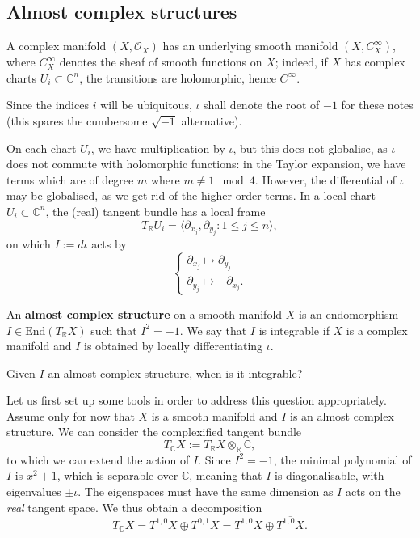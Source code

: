 \documentclass[11pt]{amsart}
\newcommand{\cO}{\mathcal{O}}
\newcommand{\tbf}[1]{\textbf{#1}}
\newcommand{\R}{\mathbb R}
\newcommand{\C}{\mathbb C}
\theoremstyle{definition}
\numberwithin{equation}{section}
\begin{document}
\subsection{Almost complex structures}
A complex manifold $(X,\cO_X)$ has an underlying smooth manifold $(X, C^\infty_X)$, where $C^\infty_X$ denotes the sheaf of smooth functions on $X$; indeed, if $X$ has complex charts $U_i\subset \C^n$, the transitions are holomorphic, hence $C^\infty$. 
\begin{notation}
	Since the indices $i$ will be ubiquitous, $\iota$ shall denote the root of $-1$ for these notes (this spares the cumbersome $\sqrt{-1}$ alternative).
\end{notation}
On each chart $U_i$, we have multiplication by $\iota$, but this does not globalise, as $\iota$ does not commute with holomorphic functions: in the Taylor expansion, we have terms which are of degree $m$ where $m\neq 1\mod 4$. However, the differential of $\iota$ may be globalised, as we get rid of the higher order terms. In a local chart $U_i\subset \C^n$, the (real) tangent bundle has a local frame
\[
T_\R U_i=\langle \partial_{x_j},\partial_{y_j}:1\leq j\leq n\rangle,
\]
on which $I:=d\iota$ acts by
\[
\begin{cases}
	\partial_{x_j}\mapsto \partial_{y_j}\\
	\partial_{y_j}\mapsto -\partial_{x_j}.
\end{cases}
\]
\begin{definition}
	An \tbf{almost complex structure} on a smooth manifold $X$ is an endomorphism $I\in \text{End}(T_\R X)$ such that $I^2=-1$. We say that $I$ is integrable if $X$ is a complex manifold and $I$ is obtained by locally differentiating $\iota$. 
\end{definition}
\begin{question}\label{q: integrable?}
	Given $I$ an almost complex structure, when is it integrable?
\end{question}
Let us first set up some tools in order to address this question appropriately. Assume only for now that $X$ is a smooth manifold and $I$ is an almost complex structure. We can consider the complexified tangent bundle 
\[
T_\C X:=T_\R X\otimes_\R \C,
\]
to which we can extend the action of $I$. Since $I^2={-1}$, the minimal polynomial of $I$ is $x^2+1$, which is separable over $\C$, meaning that $I$ is diagonalisable, with eigenvalues $\pm \iota$. The eigenspaces must have the same dimension as $I$ acts on the \emph{real} tangent space. We thus obtain a decomposition
\[
T_\C X=T^{1,0}X\oplus T^{0,1}X= T^{1,0}X\oplus \overline{T^{1,0}X}.
\]
\end{document}
